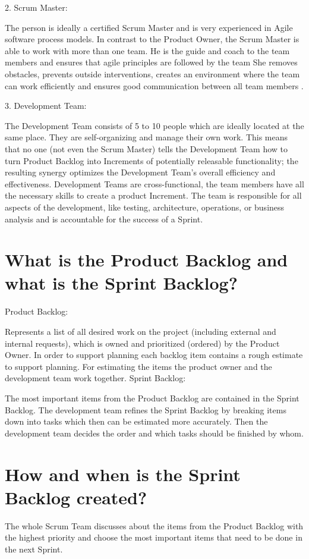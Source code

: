 \documentclass[a4paper, 12pt]{article}
\begin{document}
2. Scrum Master:

The person is ideally a certified Scrum Master and is very experienced in Agile software process models.
In contrast to the Product Owner, the Scrum Master is able to work with more than one team.
He is the guide and coach to the team members and ensures that agile principles are followed by the team
She removes obstacles, prevents outside interventions, creates an environment where the team can work efficiently and ensures good communication between all team members .
\bigskip    

3. Development Team:

The Development Team consists of 5 to 10 people which are ideally located at the same place. They are self-organizing and manage their own work. This means that no one (not even the Scrum Master) tells the Development Team how to turn Product Backlog into Increments of potentially releasable functionality; the resulting synergy optimizes the Development Team’s overall efficiency and effectiveness.
Development Teams are cross-functional, the team members have all the necessary skills to create a product Increment. 
The team is responsible for all aspects of the development,  like testing, architecture, operations, or business analysis and is accountable for the success of a Sprint. \cite{scrumguideteamdev}


\section{What is the Product Backlog and what is the Sprint Backlog?}

Product Backlog:

Represents a list of all desired work on the project (including external and
         internal requests), which is owned and prioritized (ordered) by the Product Owner. In order to support planning each backlog item contains a rough estimate to support planning. For estimating the items the product owner and the development team work together.
\newpage
Sprint Backlog:

The most important items from the Product Backlog are contained in the Sprint Backlog. The development team refines the Sprint Backlog by breaking items down into tasks which then can be estimated more accurately. Then the development team decides the order and which tasks should be finished by whom.

\section{How and when is the Sprint Backlog created?}
The whole Scrum Team discusses about the items from the Product Backlog with the highest priority and choose the most important items that need to be done in the next Sprint. \cite{thoma2}
\end{document}

